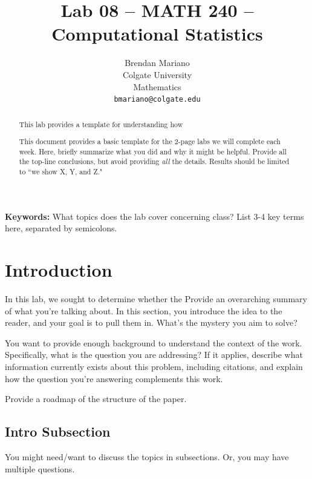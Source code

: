\documentclass{article}\usepackage[]{graphicx}\usepackage[]{xcolor}
\begin{document}
\vspace{-1in}
\title{Lab 08 -- MATH 240 -- Computational Statistics}

\author{
  Brendan Mariano \\
  Colgate University  \\
  Mathematics  \\
  {\tt bmariano@colgate.edu}
}

\date{}

\maketitle

\begin{multicols}{2}
\begin{abstract}
This lab provides a template for understanding how 

This document provides a basic template for the 2-page labs we will complete each week. Here, briefly summarize what you did and why it might be helpful. Provide all the top-line conclusions, but avoid providing \emph{all} the details. Results should be limited to ``we show X, Y, and Z."
\end{abstract}

\noindent \textbf{Keywords:} What topics does the lab cover concerning class? List 3-4 key terms here, separated by semicolons.

\section{Introduction}
In this lab, we sought to determine whether the 
Provide an overarching summary of what you're talking about. In this section, you introduce the idea to the reader, and your goal is to pull them in. What's the mystery you aim to solve?

You want to provide enough background to understand the context of the work. Specifically, what is the question you are addressing? If it applies, describe what information currently exists about this problem, including citations, and explain how the question you're answering complements this work.

Provide a roadmap of the structure of the paper. 

\subsection{Intro Subsection}
You might need/want to discuss the topics in subsections. Or, you may have multiple questions.


\end{multicols}
\end{document}
